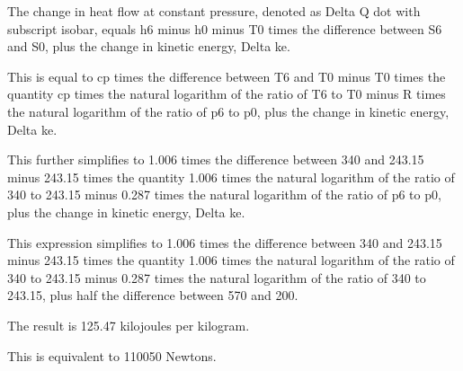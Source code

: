 The change in heat flow at constant pressure, denoted as Delta Q dot with subscript isobar, equals h6 minus h0 minus T0 times the difference between S6 and S0, plus the change in kinetic energy, Delta ke.

This is equal to cp times the difference between T6 and T0 minus T0 times the quantity cp times the natural logarithm of the ratio of T6 to T0 minus R times the natural logarithm of the ratio of p6 to p0, plus the change in kinetic energy, Delta ke.

This further simplifies to 1.006 times the difference between 340 and 243.15 minus 243.15 times the quantity 1.006 times the natural logarithm of the ratio of 340 to 243.15 minus 0.287 times the natural logarithm of the ratio of p6 to p0, plus the change in kinetic energy, Delta ke.

This expression simplifies to 1.006 times the difference between 340 and 243.15 minus 243.15 times the quantity 1.006 times the natural logarithm of the ratio of 340 to 243.15 minus 0.287 times the natural logarithm of the ratio of 340 to 243.15, plus half the difference between 570 and 200.

The result is 125.47 kilojoules per kilogram.

This is equivalent to 110050 Newtons.